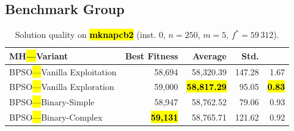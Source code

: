\documentclass[mathematics,article,accept,moreauthors]{Definitions/mdpi}
\begin{document}
\subsection{Benchmark Group }

\vspace{-9pt}

\begin{table}[H]
  \small
  \caption{Solution quality on \textbf{\hl{mknapcb2}} (inst. 0, $n=250$, $m=5$, $f^*=59\,312$).}
  \label{tab:calidad_mknapcb2_0}
  \begin{tabularx}{\textwidth}{lRRRR}
    \toprule
    \textbf{MH\hl{---}Variant} &
    \textbf{Best Fitness} &
    \textbf{Average} &
    \textbf{Std.} &
    \textbf{} \\
    \midrule
    BPSO\hl{---}Vanilla Exploitation &          58,694 &         58,320.39 & 147.28 &         1.67 \\
    BPSO\hl{---}Vanilla Exploration  &          59,000 & \textbf{\hl{58,817.29}} &  95.05 & \textbf{\hl{0.83}} \\
    BPSO\hl{---}Binary-Simple        &          58,947 &         58,762.52 &  79.06 &         0.93 \\
    BPSO\hl{---}Binary-Complex       & \textbf{\hl{59,131}} &         58,765.71 & 121.62 &         0.92 \\


\bottomrule
\end{tabularx} %
\end{table}
\end{document}
